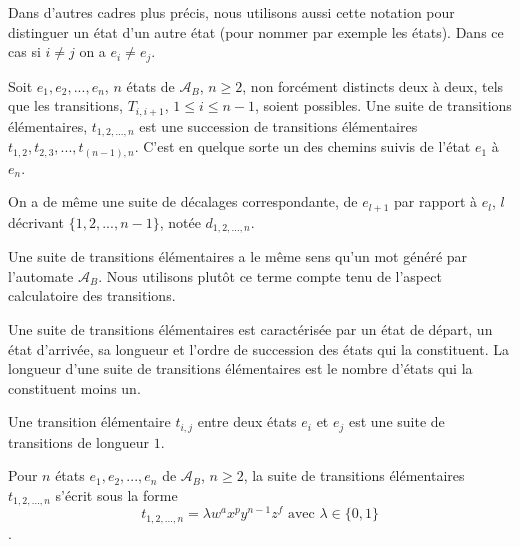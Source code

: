  Dans d'autres cadres plus précis, nous utilisons aussi cette notation pour distinguer un état d'un autre état (pour nommer par exemple les états). Dans ce cas si $i\neq j$ on a $e_{i}\neq e_{j}$.

\begin{Def}\label{prop6}
Soit $e_{1}, e_{2},...,e_{n}$, $n$ états de $\mathcal{A}_{B}$, $n\geq 2$, non forcément distincts deux à deux, tels que les transitions, $T_{i,i+1}$, $1\leq i \leq n-1$, soient possibles. Une suite de transitions élémentaires, $t_{1,2,...,n}$ est une succession de transitions élémentaires $t_{1,2}, t_{2,3},...,t_{(n-1),n}$. C'est en quelque sorte un des chemins suivis de l'état $e_{1}$ à $e_{n}$.

  On a de même une suite de décalages  correspondante, de $e_{l+1}$ par rapport à $e_{l}$, $l$ décrivant $\{1,2,...,n-1\}$, notée $d_{1,2,...,n}$.
\end{Def}
\begin{Rem}
Une suite de transitions élémentaires a le même sens qu'un mot généré par l'automate $\mathcal{A}_{B}$. Nous utilisons plutôt ce terme compte tenu de l'aspect calculatoire des transitions.


 Une suite de transitions élémentaires est caractérisée par un état de départ, un état d'arrivée, sa longueur et l'ordre de succession des états qui la constituent. La longueur d'une suite de transitions élémentaires est le nombre d'états qui la constituent moins un.
 
  
Une transition élémentaire $t_{i,j}$ entre deux états $e_{i}$ et $e_{j}$ est une suite de transitions de longueur $1$.

Pour $n$ états $e_{1}, e_{2},...,e_{n}$  de $\mathcal{A}_{B}$, $n\geq 2$, la suite de transitions élémentaires $t_{1,2,...,n}$ s'écrit sous la forme $$t_{1,2,...,n}= \lambda w^{a}x^{p}y^{n-1}z^{f} \text{ avec }\lambda \in \{0,1\}$$.
\end{Rem}
 
